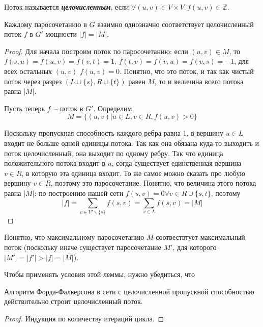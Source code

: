\begin{definition}
	Поток называется {\it\bf целочисленным}, если $\forall (u,v)\in V\times V\colon f(u,v)\in\mathbb{Z}$.
\end{definition}
\begin{lemma}
	Каждому паросочетанию в $G$ взаимно однозначно соответствует целочисленный поток $f$ в $G'$ мощности $|f|=|M|$.
\end{lemma}
\begin{proof}
	Для начала построим поток по паросочетанию: если $(u,v)\in M$, то $f(s,u)=f(u,v)=f(v,t)=1$, $f(t,v)=f(v,u)=f(v,s)=-1$, для всех остальных $(u,v)$ $f(u,v)=0$. Понятно, что это поток, и так как чистый поток через разрез $(L\cup\{s\},R\cup\{t\})$ равен $M$, то и величина всего потока равна $|M|$.
	
	Пусть теперь $f$~-- поток в $G'$. Определим $$M=\{(u,v)|u\in L, v\in R, f(u,v)>0\}$$
	
	Поскольку пропускная способность каждого ребра равна 1, в вершину $u\in L$ входит не больше одной единицы потока. Так как она обязана куда-то выходить и поток целочисленный, она выходит по одному ребру. Так что единица положительного потока входит в $u$, согда существует единственная вершина $v\in R$, в которую эта единица входит. То же самое можно сказать про любую вершину $v\in R$, поэтому это паросочетание. Понятно, что величина этого потока равна $|M|$: по построению нашей сети $f(s,v)=0 \forall v\in R\cup\{s,t\}$, поэтому $$|f|=\sum_{v\in V'\smallsetminus\{s\}}f(s,v)=\sum_{v\in L}f(s,v)=|M|$$
\end{proof}

Понятно, что максимальному паросочетанию $M$ соотвествтует максимальный поток (поскольку иначе существует паросочетание $M'$, для которого $|M'|=|f'|>|f|=|M|$).

Чтобы применять условия этой леммы, нужно убедиться, что 
\begin{lemma}
	Алгоритм Форда-Фалкерсона в сети с целочисленной пропускной способностью действительно строит целочисленный поток.
\end{lemma}
\begin{proof}
	Индукция по количеству итераций цикла.
\end{proof}
